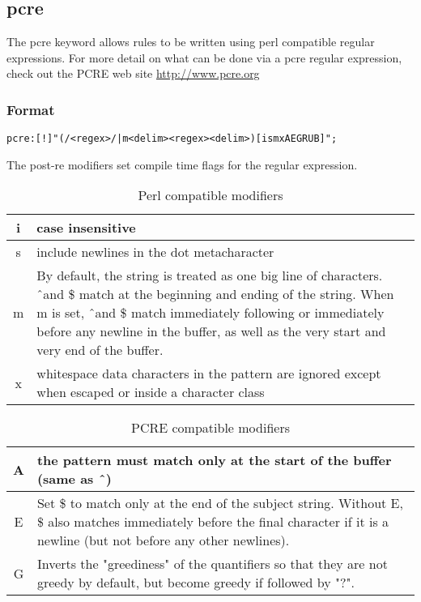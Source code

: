 \documentclass[english]{report}
\begin{document}
\subsection{pcre \label{pcre}}
The pcre keyword allows rules to be written using perl compatible regular expressions.   
For more detail on what can be done via a pcre regular expression, check out the PCRE web site \url{http://www.pcre.org}

\subsubsection{Format}
\begin{verbatim}
pcre:[!]"(/<regex>/|m<delim><regex><delim>)[ismxAEGRUB]";
\end{verbatim}
The post-re modifiers set compile time flags for the regular expression.

\begin{longtable}{|c|p{3.5in}|}
\caption{Perl compatible modifiers} \\
\hline
i & case insensitive \\
\hline
s & include newlines in the dot metacharacter \\
\hline
m & By default, the string is treated as one big line of characters.  \^\ and \$ match at the beginning and ending of the string. When m is set, \^\ and \$  match immediately following or immediately before any newline in the buffer, as well as the very start and very end of the buffer. \\
\hline
x & whitespace  data characters in the pattern are ignored except when escaped or inside a character class \\
\hline
\end{longtable}

\begin{longtable}{|c|p{3.5in}|}
\caption{PCRE compatible modifiers} \\
\hline
A & the pattern must match only at the start of the buffer (same as \^\ ) \\
\hline
E & Set \$ to match only at the end of the subject string.  Without E, \$ also matches immediately before the final character if it is a newline (but not before any other newlines). \\
\hline
G & Inverts the "greediness" of the quantifiers so that they are not greedy by default, but become greedy if followed by "?". \\
\hline
\end{longtable}
\end{document}
